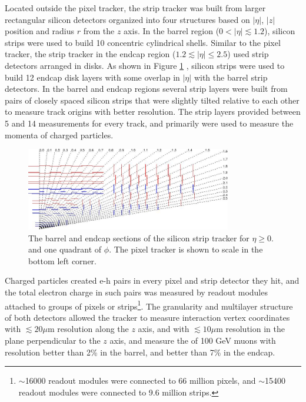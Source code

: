 Located outside the pixel tracker, the strip tracker was built from larger rectangular silicon detectors 
organized into four structures based on $|\eta|$, $|z|$ position and radius $r$ from the $z$ axis.  In the barrel region 
($0 < |\eta| \lesssim 1.2$), silicon strips were used to build 10 concentric cylindrical shells.  Similar to the pixel tracker, the strip tracker in 
the endcap region ($1.2 \lesssim |\eta| \leq 2.5$) used strip detectors arranged in disks.  As shown in Figure \ref{fig:stripTracker} 
\cite{cmsTDR}, silicon strips were used to build 12 endcap disk layers with some overlap in $|\eta|$ with the 
barrel strip detectors.  In the barrel and endcap regions several strip layers were built from pairs of closely spaced 
silicon strips that were slightly tilted relative to each other to measure track origins with better resolution.  The 
strip layers provided between 5 and 14 measurements for every track, and primarily were used to measure the momenta 
of charged particles.

\begin{figure}[ht]
	\centering
	\includegraphics[width=0.8\textwidth]{figures/siliconStripAndPixelDetectorTwoDimView.png}
	\caption{The barrel and endcap sections of the silicon strip tracker for $\eta \geq 0.$ and one quadrant of $\phi$.  The pixel tracker is shown to scale in the bottom left corner.}
	\label{fig:stripTracker}
\end{figure}

Charged particles created e-h pairs in every pixel and strip detector they hit, and the total electron charge in such pairs was measured by readout 
modules attached to groups of pixels or strips\footnote{$\sim$16000 readout modules were connected to 66 million pixels, 
and $\sim$15400 readout modules were connected to 9.6 million strips.}.  
The granularity and multilayer structure of both detectors allowed the tracker to measure interaction vertex coordinates 
with $\lesssim 20\mu$m resolution along the $z$ axis, and with $\lesssim 10\mu$m resolution in the plane perpendicular to 
the $z$ axis, and measure the \pt of 100 GeV \pt muons with resolution better than 2\% in the barrel, and better than 
7\% in the endcap.

